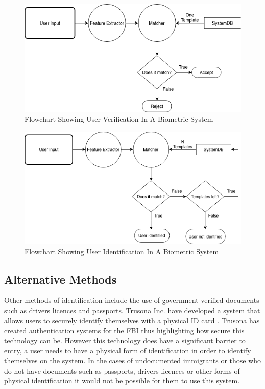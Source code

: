 \documentclass[12pt]{article}
\begin{document}
		\begin{figure}[H]
	    \centering
	    \includegraphics[width=\textwidth]{biometric_flowcharts-Verification.png}
	    \caption{Flowchart Showing User Verification In A Biometric System \citep{jain2004introduction}}
	    \label{fig:flowchat:verification}
	\end{figure}
	
		\begin{figure}[H]
	    \centering
	    \includegraphics[width=\textwidth]{biometric_flowcharts-Identification.png}
	    \caption{Flowchart Showing User Identification In A Biometric System \citep{jain2004introduction}}
	    \label{fig:flowchat:identification}
	\end{figure}
	
	\subsection{Alternative Methods}
	Other methods of identification include the use of government verified documents such as drivers licences and passports.
	Trusona Inc. have developed a system that allows users to securely identify themselves with a physical ID card \citep{eisen2017systems}. Trusona has created authentication systems for the FBI \citep{abagnale_2017} thus highlighting how secure this technology can be. However this technology does have a significant barrier to entry, a user needs to have a physical form of identification in order to identify themselves on the system. In the cases of undocumented immigrants or those who do not have documents such as passports, drivers licences or other forms of physical identification it would not be possible for them to use this system.
	
\end{document}
